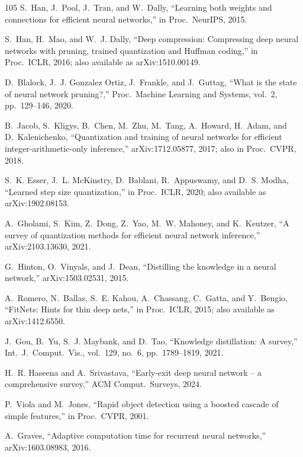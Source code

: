 \begin{thebibliography}{105}
S.~Han, J.~Pool, J.~Tran, and W.~Dally, ``Learning both weights and connections for efficient neural networks,'' in Proc.\ NeurIPS, 2015.

S.~Han, H.~Mao, and W.~J. Dally, ``Deep compression: Compressing deep neural networks with pruning, trained quantization and Huffman coding,'' in Proc.\ ICLR, 2016; also available as arXiv:1510.00149.

D.~Blalock, J.~J. Gonzalez Ortiz, J.~Frankle, and J.~Guttag, ``What is the state of neural network pruning?,'' Proc.\ Machine Learning and Systems, vol.~2, pp.~129--146, 2020.

B.~Jacob, S.~Kligys, B.~Chen, M.~Zhu, M.~Tang, A.~Howard, H.~Adam, and D.~Kalenichenko, ``Quantization and training of neural networks for efficient integer-arithmetic-only inference,'' arXiv:1712.05877, 2017; also in Proc.\ CVPR, 2018.

S.~K. Esser, J.~L. McKinstry, D.~Bablani, R.~Appuswamy, and D.~S. Modha, ``Learned step size quantization,'' in Proc.\ ICLR, 2020; also available as arXiv:1902.08153.

A.~Gholami, S.~Kim, Z.~Dong, Z.~Yao, M.~W. Mahoney, and K.~Keutzer, ``A survey of quantization methods for efficient neural network inference,'' arXiv:2103.13630, 2021.

G.~Hinton, O.~Vinyals, and J.~Dean, ``Distilling the knowledge in a neural network,'' arXiv:1503.02531, 2015.

A.~Romero, N.~Ballas, S.~E. Kahou, A.~Chassang, C.~Gatta, and Y.~Bengio, ``FitNets: Hints for thin deep nets,'' in Proc.\ ICLR, 2015; also available as arXiv:1412.6550.

J.~Gou, B.~Yu, S.~J. Maybank, and D.~Tao, ``Knowledge distillation: A survey,'' Int.\ J.\ Comput.\ Vis., vol.~129, no.~6, pp.~1789--1819, 2021.

H.~R. Haseena and A.~Srivastava, ``Early-exit deep neural network -- a comprehensive survey,'' ACM Comput.\ Surveys, 2024.

P.~Viola and M.~Jones, ``Rapid object detection using a boosted cascade of simple features,'' in Proc.\ CVPR, 2001.

A.~Graves, ``Adaptive computation time for recurrent neural networks,'' arXiv:1603.08983, 2016.


\end{thebibliography}
